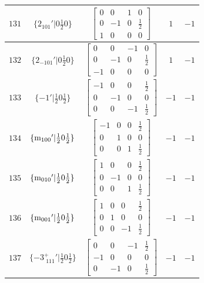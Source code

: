 \documentclass[fleqn,8pt]{jsarticle}
\begin{document}
\begin{longtable}{ccccc}
$ 131 $ & $ \{2{}_{101}{}'|0 \frac{1}{2} 0\} $ & $ \begin{bmatrix} 0 & 0 & 1 & 0 \\ 0 & -1 & 0 & \frac{1}{2} \\ 1 & 0 & 0 & 0 \end{bmatrix} $ & $ 1 $ & $ -1 $ \\ \hline
$ 132 $ & $ \{2{}_{-101}{}'|0 \frac{1}{2} 0\} $ & $ \begin{bmatrix} 0 & 0 & -1 & 0 \\ 0 & -1 & 0 & \frac{1}{2} \\ -1 & 0 & 0 & 0 \end{bmatrix} $ & $ 1 $ & $ -1 $ \\ \hline
$ 133 $ & $ \{-1{}'|\frac{1}{2} 0 \frac{1}{2}\} $ & $ \begin{bmatrix} -1 & 0 & 0 & \frac{1}{2} \\ 0 & -1 & 0 & 0 \\ 0 & 0 & -1 & \frac{1}{2} \end{bmatrix} $ & $ -1 $ & $ -1 $ \\ \hline
$ 134 $ & $ \{{\rm m}_{100}{}'|\frac{1}{2} 0 \frac{1}{2}\} $ & $ \begin{bmatrix} -1 & 0 & 0 & \frac{1}{2} \\ 0 & 1 & 0 & 0 \\ 0 & 0 & 1 & \frac{1}{2} \end{bmatrix} $ & $ -1 $ & $ -1 $ \\ \hline
$ 135 $ & $ \{{\rm m}_{010}{}'|\frac{1}{2} 0 \frac{1}{2}\} $ & $ \begin{bmatrix} 1 & 0 & 0 & \frac{1}{2} \\ 0 & -1 & 0 & 0 \\ 0 & 0 & 1 & \frac{1}{2} \end{bmatrix} $ & $ -1 $ & $ -1 $ \\ \hline
$ 136 $ & $ \{{\rm m}_{001}{}'|\frac{1}{2} 0 \frac{1}{2}\} $ & $ \begin{bmatrix} 1 & 0 & 0 & \frac{1}{2} \\ 0 & 1 & 0 & 0 \\ 0 & 0 & -1 & \frac{1}{2} \end{bmatrix} $ & $ -1 $ & $ -1 $ \\ \hline
$ 137 $ & $ \{-3^{+}_{\,\,111}{}'|\frac{1}{2} 0 \frac{1}{2}\} $ & $ \begin{bmatrix} 0 & 0 & -1 & \frac{1}{2} \\ -1 & 0 & 0 & 0 \\ 0 & -1 & 0 & \frac{1}{2} \end{bmatrix} $ & $ -1 $ & $ -1 $ \\ \hline

\end{longtable}
\end{document}
